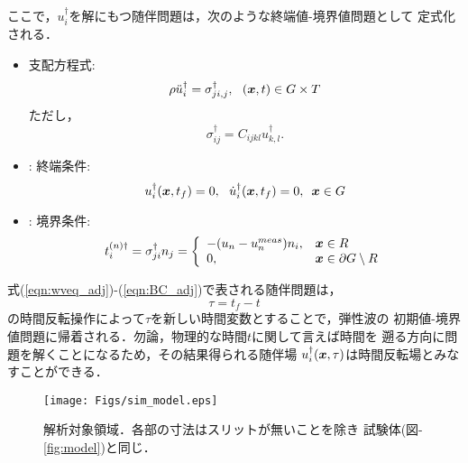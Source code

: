 ここで，$u_i^{\dagger}$を解にもつ随伴問題は，次のような終端値-境界値問題として
定式化される．
\begin{itemize}
\item
支配方程式:
\begin{equation}
	\rho \ddot{u}_i^{\dagger} =
	\sigma^{\dagger}_{ji,j}, \ \ 
	(\fat{x},t) \in G\times T
	\label{eqn:wveq_adj}
\end{equation}
ただし，
\begin{equation}
	\sigma_{ij}^{\dagger}= C_{ijkl}u_{k,l}^{\dagger}.
	\label{eqn:sigma_dgg}
\end{equation}
\item: 
終端条件:
\begin{equation}
	u_i^{\dagger}(\boldsymbol{x},t_f) =0,  \ \
	\dot{u}_i^{\dagger}(\boldsymbol{x},t_f) =0,  \ \, \boldsymbol{x}\in G
	\label{eqn:IC_adj}
\end{equation}
\item:
境界条件:
\begin{equation}
	t_i^{(n)\dagger}
	=
	\sigma_{ji}^{\dagger}n_j =
	\left\{
		\begin{array}{ll}
			-(u_n-u_n^{meas})n_i, & \boldsymbol{x}\in R \\
			0, & \boldsymbol{x} \in \partial G\setminus R
		\end{array}
	\right.
	\label{eqn:BC_adj}
\end{equation}
\end{itemize}
式(\ref{eqn:wveq_adj})-(\ref{eqn:BC_adj})で表される随伴問題は，
\begin{equation}
	\tau=t_f-t
	\label{eqn:tau_def}
\end{equation}
の時間反転操作によって$\tau$を新しい時間変数とすることで，弾性波の
初期値-境界値問題に帰着される．勿論，物理的な時間$t$に関して言えば時間を
遡る方向に問題を解くことになるため，その結果得られる随伴場
$u_i^{\dagger}(\boldsymbol{x},\tau)$は時間反転場とみなすことができる．
\begin{figure}[htb]
\centering
	\texttt{[image: Figs/sim\_model.eps]}
	\caption{解析対象領域．各部の寸法はスリットが無いことを除き
	試験体({\rm 図}-\ref{fig:model})と同じ．}
	\label{fig:fd_model}
\end{figure}
